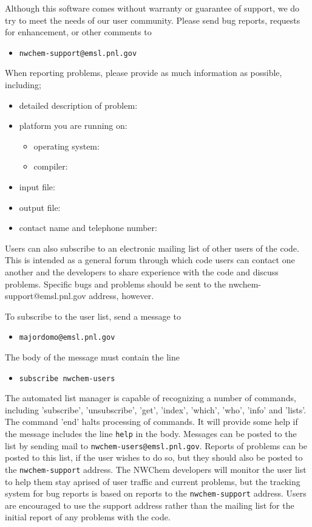 Although this software comes without warranty or guarantee of support,
we do try to meet the needs of our user community.  Please send bug
reports, requests for enhancement, or other comments to

\begin{itemize}
\item {\tt nwchem-support@emsl.pnl.gov}
\end{itemize}

When reporting problems, please provide as much information as possible, 
including;

\begin{itemize}
\item detailed description of problem:
\item platform you are running on:
\begin{itemize}
\item operating system:
\item compiler:
\end{itemize}
\item input file:
\item output file:
\item contact name and telephone number:
\end{itemize}


Users can also subscribe to an electronic mailing list of other users of
 the code.  This is intended as a general forum through which code users 
can contact one another and the developers to share experience with the code
and discuss problems.  Specific bugs and problems should be sent to the
nwchem-support@emsl.pnl.gov address, however.

To subscribe to the user list, send a message to 

\begin{itemize}
\item {\tt majordomo@emsl.pnl.gov}
\end{itemize}

The body of the message must contain the line 

\begin{itemize}
\item {\tt subscribe nwchem-users}
\end{itemize}

The automated list manager is capable of recognizing a number of commands, including
'subscribe', 'unsubscribe', 'get', 'index', 'which', 'who', 'info' and 
'lists'.  The command 'end' halts processing of commands.  It will provide
some help if the message includes the line {\tt help} in the body.  Messages
can be posted to the list by
sending mail to {\tt nwchem-users@emsl.pnl.gov}.  Reports of problems can
be posted to this list, if the user wishes to do so, but they should also
be posted to the {\tt nwchem-support} address.  The NWChem developers
will monitor the user list to help them stay aprised of user traffic and
 current problems, but 
the tracking system for bug reports is based on reports to the
 {\tt nwchem-support} address.  Users are encouraged to use the support 
address rather than the mailing list for
the initial report of any problems with the code.

